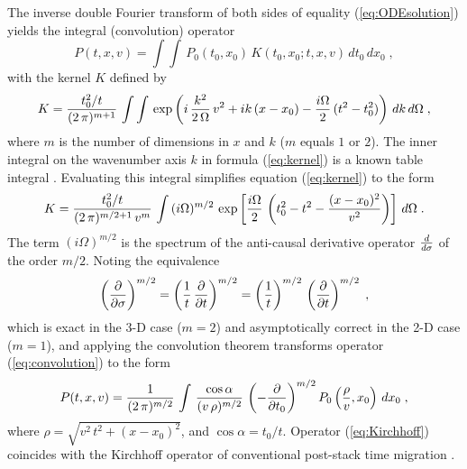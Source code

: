 The inverse double Fourier transform of both sides of equality
(\ref{eq:ODEsolution}) yields the integral (convolution) operator
\begin{equation}
P(t,x,v) = \int\int\,P_0(t_0,x_0)\,K(t_0,x_0;t,x,v)\,dt_0\,dx_0\;,
\label{eq:convolution}
\end{equation}
with the kernel $K$ defined by
\begin{equation}
K = {{t_0^2/t} \over {(2\,\pi)^{m+1}}}\,
\int\int\,\exp\left(
i\,{{k^2} \over {2\,\Omega}}\,v^2 + ik\,(x - x_0) - 
{{i\Omega} \over 2}\,(t^2 - t_0^2)
\right)\,dk\,d\Omega\;,
\label{eq:kernel}
\end{equation}
where $m$ is the number of dimensions in $x$ and $k$ ($m$ equals $1$
or $2$). The inner integral on the wavenumber axis $k$ in formula
(\ref{eq:kernel}) is a known table integral \cite[]{grad}. Evaluating this
integral simplifies equation (\ref{eq:kernel}) to the form
\begin{equation}
K = {{t_0^2/t} \over {(2\,\pi)^{m/2+1}\,v^m}}\,
\int\,(i\Omega)^{m/2}\,\exp\left[
{{i\Omega} \over 2}\,
\left(t_0^2 - t^2 - {{(x - x_0)^2} \over v^2}\right)\right]\,
d\Omega\;.
\label{eq:skernel}
\end{equation}
The term $(i\Omega)^{m/2}$ is the spectrum of the anti-causal
derivative operator ${d \over {d\sigma}}$ of the order $m/2$. Noting
the equivalence
\begin{equation}
\left({\partial \over {\partial \sigma}}\right)^{m/2} =
\left({1 \over t}\,{\partial \over {\partial t}}\right)^{m/2} =
\left({1 \over t}\right)^{m/2}\,
\left({\partial \over {\partial t}}\right)^{m/2}\;,
\label{eq:halfdif}
\end{equation}
which is exact in the 3-D case ($m=2$) and asymptotically correct in
the 2-D case ($m=1$), and applying the convolution theorem
transforms operator (\ref{eq:convolution}) to the form
\begin{equation}
P(t,x,v) = {1 \over {(2\,\pi)^{m/2}}}\,\int\,
{{\cos{\alpha}} \over {(v\,\rho)^{m/2}}}\,
\left(- {\partial \over {\partial t_0}}\right)^{m/2}
P_0\left({\rho \over v},x_0\right)\,dx_0\;,
\label{eq:Kirchhoff}
\end{equation}
where $\rho = \sqrt{v^2\,t^2 + (x - x_0)^2}$, and $\cos{\alpha} =
t_0/t$. Operator (\ref{eq:Kirchhoff}) coincides with the Kirchhoff operator
of conventional post-stack time migration \cite[]{GEO43-01-00490076}.

\newpage
